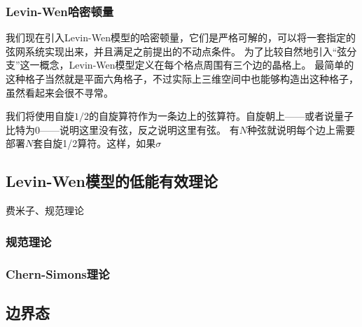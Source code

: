 \subsubsection{Levin-Wen哈密顿量}

我们现在引入Levin-Wen模型的哈密顿量，它们是严格可解的，可以将一套指定的弦网系统实现出来，并且满足之前提出的不动点条件。
为了比较自然地引入“弦分支”这一概念，Levin-Wen模型定义在每个格点周围有三个边的晶格上。
最简单的这种格子当然就是平面六角格子，不过实际上三维空间中也能够构造出这种格子，虽然看起来会很不寻常。

我们将使用自旋$1/2$的自旋算符作为一条边上的弦算符。自旋朝上——或者说量子比特为0——说明这里没有弦，反之说明这里有弦。
有$N$种弦就说明每个边上需要部署$N$套自旋1/2算符。这样，如果$\sigma$

\subsection{Levin-Wen模型的低能有效理论}

费米子、规范理论

\subsubsection{规范理论}

\subsubsection{Chern-Simons理论}

\subsection{边界态}
